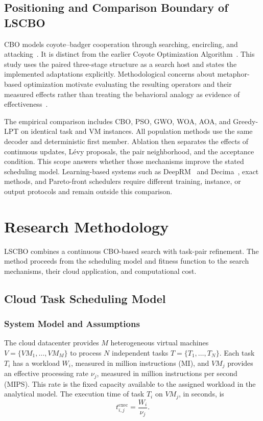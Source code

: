 \documentclass[pdflatex,onecolumn,sn-mathphys-num]{sn-jnl}
\begin{document}
\subsection{Positioning and Comparison Boundary of LSCBO}

CBO models coyote--badger cooperation through searching, encircling, and attacking~\cite{Khatab2025}. It is distinct from the earlier Coyote Optimization Algorithm~\cite{Pierezan2018}. This study uses the paired three-stage structure as a search host and states the implemented adaptations explicitly. Methodological concerns about metaphor-based optimization motivate evaluating the resulting operators and their measured effects rather than treating the behavioral analogy as evidence of effectiveness~\cite{Sorensen2015}.

The empirical comparison includes CBO, PSO, GWO, WOA, AOA, and Greedy-LPT on identical task and VM instances. All population methods use the same decoder and deterministic first member. Ablation then separates the effects of continuous updates, L\'{e}vy proposals, the pair neighborhood, and the acceptance condition. This scope answers whether those mechanisms improve the stated scheduling model. Learning-based systems such as DeepRM~\cite{Mao2016} and Decima~\cite{Mao2019}, exact methods, and Pareto-front schedulers require different training, instance, or output protocols and remain outside this comparison.

\section{Research Methodology}\label{sec3}
LSCBO combines a continuous CBO-based search with task-pair refinement. The method proceeds from the scheduling model and fitness function to the search mechanisms, their cloud application, and computational cost.

\subsection{Cloud Task Scheduling Model}\label{sec:model}

\subsubsection{System Model and Assumptions}\label{sec:system}
The cloud datacenter provides $M$ heterogeneous virtual machines $V=\{VM_1,\ldots,VM_M\}$ to process $N$ independent tasks $T=\{T_1,\ldots,T_N\}$. Each task $T_i$ has a workload $W_i$, measured in million instructions (MI), and $VM_j$ provides an effective processing rate $\nu_j$, measured in million instructions per second (MIPS). This rate is the fixed capacity available to the assigned workload in the analytical model. The execution time of task $T_i$ on $VM_j$, in seconds, is
\begin{equation}\label{eq:exec_time}
t^{\mathrm{exec}}_{i,j}=\frac{W_i}{\nu_j}.
\end{equation}
\end{document}
